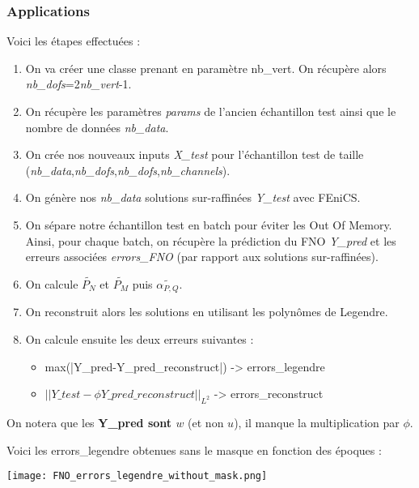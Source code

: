\subsubsection{Applications}

Voici les étapes effectuées :

\begin{enumerate}[label=\textbullet]
	\item On va créer une classe prenant en paramètre nb\_vert. On récupère alors \textit{nb\_dofs}=2\textit{nb\_vert}-1.
	\item On récupère les paramètres \textit{params} de l'ancien échantillon test ainsi que le nombre de données \textit{nb\_data}.
	\item On crée nos nouveaux inputs \textit{X\_test} pour l'échantillon test de taille (\textit{nb\_data},\textit{nb\_dofs},\textit{nb\_dofs},\textit{nb\_channels}).
	\item On génère nos \textit{nb\_data} solutions sur-raffinées \textit{Y\_test} avec FEniCS.
	\item On sépare notre échantillon test en batch pour éviter les Out Of Memory. Ainsi, pour chaque batch, on récupère la prédiction du FNO \textit{Y\_pred} et les erreurs associées \textit{errors\_FNO} (par rapport aux solutions sur-raffinées).
	\item On calcule $\widetilde{P_N}$ et $\widetilde{P_M}$ puis $\widetilde{\alpha_{P,Q}}$.
	\item On reconstruit alors les solutions en utilisant les polynômes de Legendre.
	\item On calcule ensuite les deux erreurs suivantes :
	\begin{itemize}
		\item max(|Y\_pred-Y\_pred\_reconstruct|) -> errors\_legendre
		\item $||Y\_test-\phi Y\_pred\_reconstruct||_{L^2}$  -> errors\_reconstruct
	\end{itemize}
\end{enumerate}

\begin{Rem}
	On notera que les \textbf{Y\_pred sont $w$} (et non $u$), il manque la multiplication par $\phi$.
\end{Rem}

Voici les errors\_legendre obtenues sans le masque en fonction des époques :

\begin{minipage}{\linewidth}
	\centering
	\texttt{[image: FNO\_errors\_legendre\_without\_mask.png]}
\end{minipage}

